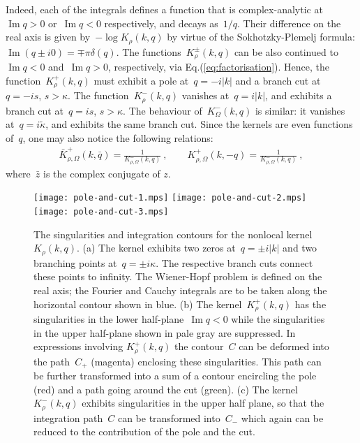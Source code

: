 \documentclass[preprint,aps,eqsecnum, prb]{revtex4-1}
\newcommand{\fplus}[1]{{#1}^{+}}
\newcommand{\fminus}[1]{{#1}^{-}}
\newcommand{\fplusminus}[1]{{#1}^{\pm}}
\renewcommand{\Im}{\mathop{\mathrm{Im}}\nolimits}
\begin{document}
Indeed, each of the integrals defines a function that is complex-analytic
at~\mbox{$\Im q > 0$} or~\mbox{$\Im q < 0$} respectively,
and decays as~$1/q$.
Their difference on the real axis is given by~$-\log K_\rho(k, q)$ by virtue
of the Sokhotzky-Plemelj formula: $\Im (q \pm  i0) = \mp\pi \delta(q)$.
The functions~$\fplusminus{K}_\rho(k, q)$
can be also continued to~$\Im q < 0$ and~$\Im q > 0$, respectively,
via Eq.(\ref{eq:factorisation}). Hence, the function~$\fplus{K}_\rho(k, q)$ must
exhibit a pole at~$q = -i |k|$ and a branch cut at~$q = -is$, $s > \kappa$.
The function~$\fminus{K}_\rho(k, q)$ vanishes at~$q = i |k|$,
and exhibits a branch cut at~$q = i s$, $s > \kappa$.
The behaviour of~$\fminus{K}_\Omega(k, q)$ is similar:
it vanishes at~$q = i \tilde{\kappa}$,
and exhibits the same branch cut.
Since the kernels are even functions of~$q$, one may also
notice the following relations:
\begin{align}
\fplus{\bar{K}}_{\rho, \Omega}(k, \bar{q})
= \frac{1}{\fminus{K}_{\rho, \Omega}(k, q)} \ , \qquad
\fplus{K}_{\rho, \Omega}(k, -q)
= \frac{1}{\fminus{K}_{\rho, \Omega}(k, q)} \ ,
\end{align}
where~${\bar z}$ is the complex conjugate of
$z$.

\begin{figure}
  \centering
  \texttt{[image: pole-and-cut-1.mps]} \qquad
  \texttt{[image: pole-and-cut-2.mps]} \qquad
  \texttt{[image: pole-and-cut-3.mps]}
  \caption{
   \label{fig:contours}
   The singularities and integration contours for the nonlocal kernel
   $K_\rho(k, q)$. (a) The kernel exhibits two zeros at~$q = \pm i|k|$
   and two branching points at~$q = \pm i \kappa$. The respective
   branch cuts connect these points to infinity. The Wiener-Hopf
   problem is defined on the real axis; the Fourier and Cauchy integrals
   are to be taken along the horizontal contour shown in blue.
   (b) The kernel~$\fplus{K}_\rho(k, q)$ has the singularities in the
   lower half-plane~$\Im q < 0$ while the singularities in the upper half-plane
   shown in pale gray are suppressed. In expressions involving
   $\fplus{K}_\rho(k, q)$ the contour~$C$ can be deformed into the path~$C_+$
   (magenta) enclosing these singularities. This path can be further
   transformed into a sum of a contour encircling the pole (red)
   and a path going around the cut (green). (c)
   The kernel~$\fminus{K}_\rho(k, q)$ exhibits singularities in
   the upper half plane, so that the integration path~$C$ can
   be transformed into~$C_-$ which again can be reduced to the
   contribution of the pole and the cut. }
\end{figure}
\end{document}
